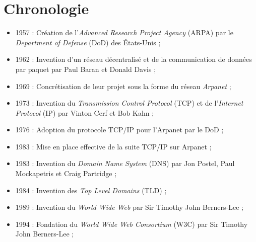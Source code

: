 \section{Chronologie}
\label{chronology}

\begin{itemize}
    \item 1957 : Création de l'\emph{Advanced Research Project Agency} (ARPA) par le \emph{Department of Defense} (DoD) des États-Unis ;
    \item 1962 : Invention d'un réseau décentralisé et de la communication de données par paquet par Paul Baran et Donald Davis ;
    \item 1969 : Concrétisation de leur projet sous la forme du réseau \emph{Arpanet} ;
    \item 1973 : Invention du \emph{Transmission Control Protocol} (TCP) et de l'\emph{Internet Protocol} (IP) par Vinton Cerf et Bob Kahn ;
    \item 1976 : Adoption du protocole TCP/IP pour l'Arpanet par le DoD ;
    \item 1983 : Mise en place effective de la suite TCP/IP sur Arpanet ;
    \item 1983 : Invention du \emph{Domain Name System} (DNS) par Jon Postel, Paul Mockapetris et Craig Partridge ;
    \item 1984 : Invention des \emph{Top Level Domains} (TLD) ;
    \item 1989 : Invention du \emph{World Wide Web} par Sir Timothy John Berners-Lee ;
    \item 1994 : Fondation du \emph{World Wide Web Consortium} (W3C) par Sir Timothy John Berners-Lee ;
\end{itemize}
